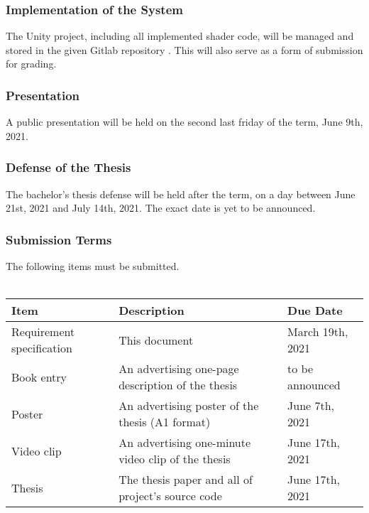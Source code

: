 \subsubsection{Implementation of the System}
The Unity project, including all implemented shader code, will be managed and stored in the given Gitlab repository \cite{gitlab}. This will also serve as a form of submission for grading.

\subsubsection{Presentation}
A public presentation will be held on the second last friday of the term, June 9th, 2021.

\subsubsection{Defense of the Thesis}
The bachelor's thesis defense will be held after the term, on a day between June 21st, 2021 and July 14th, 2021. The exact date is yet to be announced. 

\subsubsection{Submission Terms}
The following items must be submitted.
\\\\
\noindent
\begin{tabular}{|l|l|l|}
    \hline
    \textbf{Item}               & \textbf{Description}                               & \textbf{Due Date}     \\ \hline
    Requirement specification   & This document                                      & March 19th, 2021      \\ \hline
    Book entry                  & An advertising one-page description of the thesis  & to be announced       \\ \hline
    Poster                      & An advertising poster of the thesis (A1 format)    & June 7th, 2021        \\ \hline
    Video clip                  & An advertising one-minute video clip of the thesis & June 17th, 2021       \\ \hline
    Thesis                      & The thesis paper and all of project's source code  & June 17th, 2021       \\ \hline
\end{tabular}
\newline
\noindent